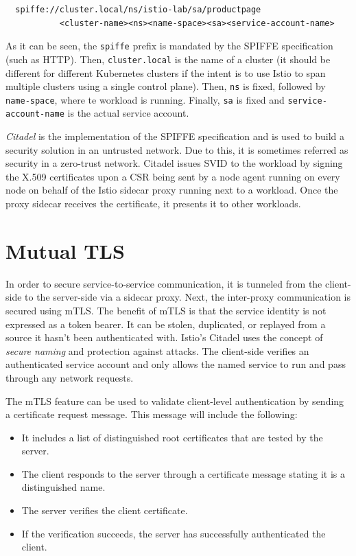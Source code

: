 \begin{lstlisting}
  spiffe://cluster.local/ns/istio-lab/sa/productpage
           <cluster-name><ns><name-space><sa><service-account-name>
\end{lstlisting}

\noindent As it can be seen, the \texttt{spiffe} prefix is mandated by the SPIFFE specification (such as HTTP). Then, \texttt{cluster.local} is the name of a cluster (it should be different for different Kubernetes clusters if the intent is to use Istio to span multiple clusters using a single control plane). Then, \texttt{ns} is fixed, followed by \texttt{name-space}, where te workload is running. Finally, \texttt{sa} is fixed and \texttt{service-account-name} is the actual service account.

\textit{Citadel} is the implementation of the SPIFFE specification and is used to build a security solution in an untrusted network. Due to this, it is sometimes referred as security in a zero-trust network. Citadel issues SVID to the workload by signing the X.509 certificates upon a CSR being sent by a node agent running on every node on behalf of the Istio sidecar proxy running next to a workload. Once the proxy sidecar receives the certificate, it presents it to other workloads.

\section{Mutual TLS}
In order to secure service-to-service communication, it is tunneled from the client-side to the server-side via a sidecar proxy. Next, the inter-proxy communication is secured using mTLS. The benefit of mTLS is that the service identity is not expressed as a token bearer. It can be stolen, duplicated, or replayed from a source it hasn't been authenticated with. Istio's Citadel uses the concept of \textit{secure naming} and protection against attacks. The client-side verifies an authenticated service account and only allows the named service to run and pass through any network requests.

The mTLS feature can be used to validate client-level authentication by sending a certificate request message. This message will include the following:

\begin{itemize}
    \item It includes a list of distinguished root certificates that are tested by the server.
    \item The client responds to the server through a certificate message stating it is a distinguished name.
    \item The server verifies the client certificate.
    \item If the verification succeeds, the server has successfully authenticated the client.
\end{itemize}

